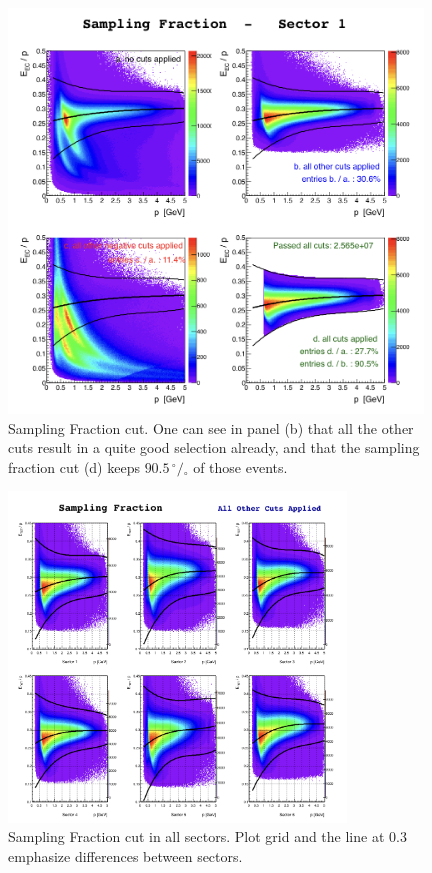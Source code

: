 \begin{figure}[tt]
  \centering
		\includegraphics[width=0.98\textwidth]{img/cut-05sampfd_sector-1.png}
		\caption{Sampling Fraction cut. One can see in panel (b) that all the other cuts 
		result in a quite good selection already, and that the sampling fraction cut (d) keeps  
		$90.5\,^{\circ\!\!}/\!_\circ$ of those events.}
 		\label{fig:sampling_fractioncut_s1}
\end{figure}

\clearpage\newpage
\begin{figure}[ht]
  \centering
		\includegraphics[width=0.8\textwidth]{img/cut-05sampf_sector-all.png}
		\caption{Sampling Fraction cut in all sectors. Plot grid and 
					the line at 0.3 emphasize differences between sectors.}
 		\label{fig:ecp_all_sectors}
\end{figure}

